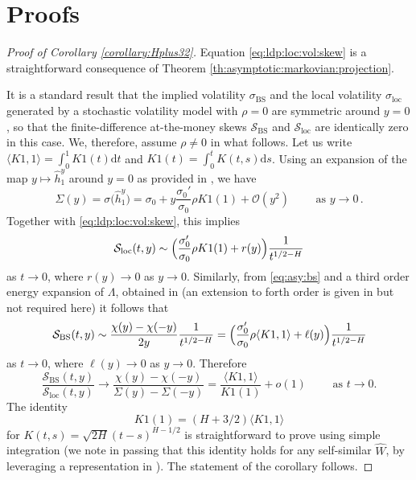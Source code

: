 \documentclass[11pt]{article}
\theoremstyle{plain}
\theoremstyle{definition}
\theoremstyle{remark}
\renewcommand{\hat}{\widehat}
\newcommand{\dd}{\mathrm{d}}
\newcommand{\cO}{\mathcal{O}}
\newcommand{\1}{\mathbf{1}}
\newcommand{\Sbs}{\mathcal{S}_\mathrm{BS}}
\newcommand{\Sloc}{\mathcal{S}_\mathrm{loc}}
\numberwithin{equation}{section}
\def\sigDup{\sigma_\mathrm{loc}}
\def\sigBS{\sigma_\mathrm{BS}}
\begin{document}
\section{Proofs}\label{sec:proofs}
\begin{proof}[Proof of Corollary \ref{corollary:Hplus32}]
Equation \eqref{eq:ldp:loc:vol:skew} is a straightforward consequence of Theorem \ref{th:asymptotic:markovian:projection}.

It is a standard result that the implied volatility $\sigBS$ and the local volatility $\sigDup$ generated by a stochastic volatility model with 
$\rho = 0$ are symmetric around $y = 0$, so that the finite-difference at-the-money skews $\Sbs$ and $\Sloc$ are identically zero in this case.
We, therefore, assume $\rho \neq 0$ in what follows. Let us write $\langle K1,1\rangle= \int_0^1 K1(t) \dd t$ and $K1(t)=\int_0^t K(t,s) \dd s$.
Using an expansion of the map $y \mapsto \hat{h}^y_1$ around $y = 0$ as provided in \cite{friz2021short},  we have
\[
\Sigma(y)= \sigma \bigl(\hat{h}^y_1\bigr)
= \sigma_0 + y \frac{\sigma_0'}{\sigma_0} \rho K1(1) + \cO(y^2) 
\qquad \mbox{ as } y \to 0 \,.
\]
Together with \eqref{eq:ldp:loc:vol:skew}, this implies
\[
\Sloc(t, y) \sim
 \Bigl(\frac{\sigma_0'}{\sigma_0} \rho K1(1)
 + r(y) \Bigr)  \frac 1 {t^{1/2 - H}}
\]
as $t \to 0$, where $r(y) \to 0$ as $y \to 0$. 
Similarly, from \eqref{eq:asy:bs} and a third order energy expansion of $\Lambda$, obtained in \cite[Thm 3.4]{bayer2017short} (an extension to forth order is given in \cite{friz2021short} but not required here) it follows that
\[
\Sbs (t, y) \sim
\frac{\chi(y) - \chi(-y)} {2y} 
 \frac 1 {t^{1/2 - H}}
=
 \Bigl(\frac{\sigma_0'}{\sigma_0} \rho \langle K1,1 \rangle + \ell(y) \Bigr)  \frac 1 {t^{1/2 - H}}
\]
as $t \to 0$, where $\ell(y) \to 0$ as $y \to 0$.
Therefore
\[
\frac{\Sbs(t, y)}{\Sloc(t, y)}
\to
\frac{\chi(y) - \chi(-y)}
{\Sigma(y) - \Sigma(-y)} = \frac{ \langle K1,1 \rangle}{K1(1)} + o(1)
\qquad \text{ as  } t \to 0.
\]
The identity
\[
K1(1)=	(H+3/2)
\langle K1,1\rangle
\]
for $K(t,s)=\sqrt{2H}(t-s)^{H-1/2}$ is straightforward to prove using simple integration
(we note in passing that this identity holds for any self-similar $\hat{W}$, by leveraging a representation in \cite{jost2007}). The statement of the corollary follows.
\end{proof}
\end{document}
